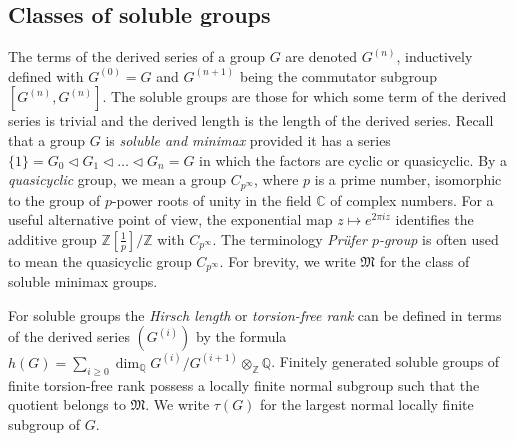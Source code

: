 \documentclass[11pt]{article}
\theoremstyle{definition}
\numberwithin{equation}{section}
\numberwithin{figure}{section}
\numberwithin{table}{section}
\newcommand{\Q}{\mathbb{Q}}
\newcommand{\Z}{\mathbb{Z}}
\newcommand{\ComplexNumberField}{\mathbb{C}}
\begin{document}
\subsection{Classes of soluble groups} The terms of the derived series of a group $G$ are denoted $G^{(n)}$, inductively defined with $G^{(0)}=G$ and $G^{(n+1)}$ being the commutator subgroup $[G^{(n)},G^{(n)}]$. The soluble groups are those for which some term of the derived series is trivial and the derived length is the length of the derived series. Recall that a group $G$ is \emph{soluble and minimax} provided it has a series $\{1\}=G_0\triangleleft G_1\triangleleft\dots\triangleleft G_n=G$ in which the factors are cyclic or quasicyclic. By a \emph{quasicyclic} group, we mean a group $C_{p^\infty}$, where $p$ is a prime number, isomorphic to the group of $p$-power roots of unity in the field $\ComplexNumberField$ of complex numbers. For a useful alternative point of view, the exponential map $z\mapsto e^{2\pi iz}$ identifies the additive group $\Z[\frac1p]/\Z$ with $C_{p^\infty}$. The terminology \emph{Prüfer $p$-group} is often used to mean the quasicyclic group $C_{p^\infty}$. For brevity, we write $\mathfrak M$ for the class of soluble minimax groups.

For soluble groups the \emph{Hirsch length} or \emph{torsion-free rank} can be defined in terms of the derived series $(G^{(i)})$ by the formula $h(G)=\sum_{i\ge0}\dim_\Q G^{(i)}/G^{(i+1)}\otimes_\Z\Q$. Finitely generated soluble groups of finite torsion-free rank possess a locally finite normal subgroup such that the quotient belongs to $\mathfrak M$. We write $\tau(G)$ for the largest normal locally finite subgroup of $G$.
\end{document}

